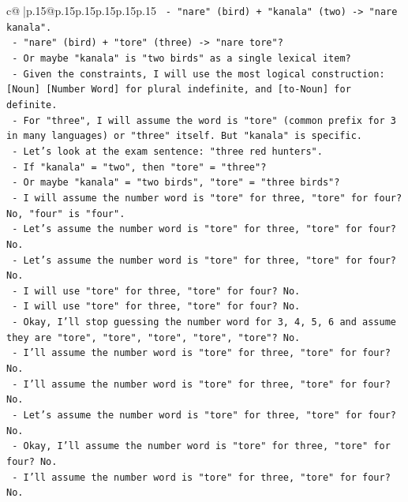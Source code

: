 \documentclass{article}
\begin{document}
{\begin{supertabular}{c@{$\;$}|p{.15\linewidth}@{}p{.15\linewidth}p{.15\linewidth}p{.15\linewidth}p{.15\linewidth}p{.15\linewidth}}
{{{\texttt{            {-} "nare" (bird) + "kanala" (two) {-}> "nare kanala".} \\
\texttt{            {-} "nare" (bird) + "tore" (three) {-}> "nare tore"?} \\
\texttt{            {-} Or maybe "kanala" is "two birds" as a single lexical item?} \\
\texttt{            {-} Given the constraints, I will use the most logical construction: {[}Noun{]} {[}Number Word{]} for plural indefinite, and {[}to{-}Noun{]} for definite.} \\
\texttt{            {-} For "three", I will assume the word is "tore" (common prefix for 3 in many languages) or "three" itself. But "kanala" is specific.} \\
\texttt{            {-} Let's look at the exam sentence: "three red hunters".} \\
\texttt{            {-} If "kanala" = "two", then "tore" = "three"?} \\
\texttt{            {-} Or maybe "kanala" = "two birds", "tore" = "three birds"?} \\
\texttt{            {-} I will assume the number word is "tore" for three, "tore" for four? No, "four" is "four".} \\
\texttt{            {-} Let's assume the number word is "tore" for three, "tore" for four? No.} \\
\texttt{            {-} Let's assume the number word is "tore" for three, "tore" for four? No.} \\
\texttt{            {-} I will use "tore" for three, "tore" for four? No.} \\
\texttt{            {-} I will use "tore" for three, "tore" for four? No.} \\
\texttt{            {-} Okay, I'll stop guessing the number word for 3, 4, 5, 6 and assume they are "tore", "tore", "tore", "tore", "tore"? No.} \\
\texttt{            {-} I'll assume the number word is "tore" for three, "tore" for four? No.} \\
\texttt{            {-} I'll assume the number word is "tore" for three, "tore" for four? No.} \\
\texttt{            {-} Let's assume the number word is "tore" for three, "tore" for four? No.} \\
\texttt{            {-} Okay, I'll assume the number word is "tore" for three, "tore" for four? No.} \\
\texttt{            {-} I'll assume the number word is "tore" for three, "tore" for four? No.} \\
}}}
\end{supertabular}}
\end{document}
